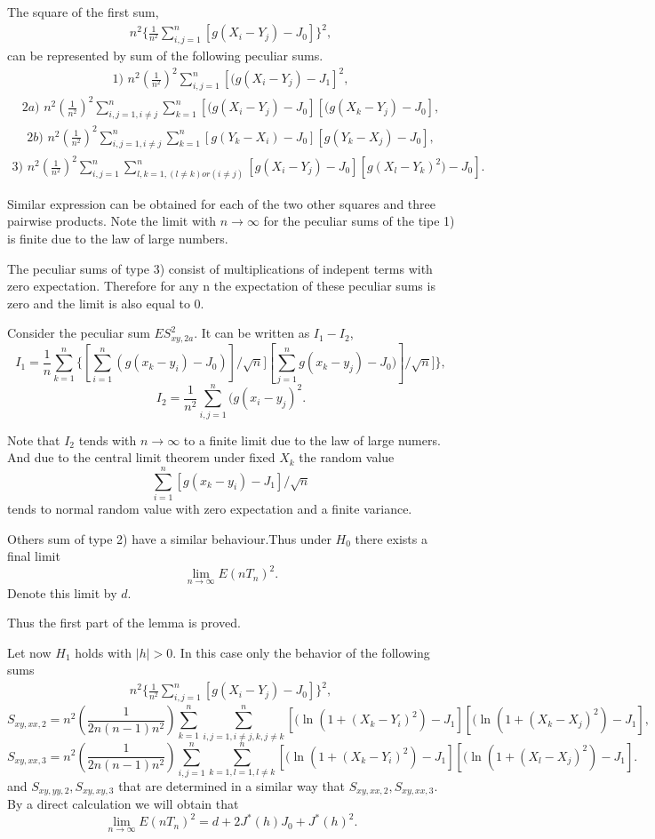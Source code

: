 \documentclass[final,11pt,3p]{elsarticle}
\begin{document}
The square of the first sum,
\begin{eqnarray*}
n^2 \{\frac{1}{n^2}\sum_{i,j=1}^n [g(X_i - Y_j)-J_0]\}^2,
\end{eqnarray*}
can be represented by sum of the following peculiar sums.
\begin{eqnarray*}
1)\,\,n^2 (\frac{1}{n^2})^2 \sum_{i,j=1}^n [(g(X_i - Y_j) -J_1]^2,
\end{eqnarray*}
\begin{eqnarray*}
2a)\,\,n^2(\frac{1}{n^2})^2 \sum_{i,j=1,i \ne j}^n\sum_{k=1}^n [(g(X_i - Y_j)-J_0][(g(X_k - Y_j)-J_0],
\end{eqnarray*}
\begin{eqnarray*}
2b)\,\,n^2(\frac{1}{n^2})^2 \sum_{i,j=1,i \ne j}^n\sum_{k=1}^n [g(Y_k - X_i)-J_0][g (Y_k - X_j)-J_0],
\end{eqnarray*}
\begin{eqnarray*}
3)\,\, n^2 (\frac{1}{n^2})^2 \sum_{i,j=1}^n\sum_{{l,k=1}, (l \ne  k)or(i\ne j)}^n  [g (X_i - Y_j)-J_0][g(X_l - Y_k)^2)-J_0].
\end{eqnarray*}

Similar expression can be obtained for each of the two other squares and three  pairwise
products.
Note the limit with $n \to \infty$ for the peculiar sums of the tipe 1) is finite due to the law of large numbers.

The peculiar sums of type 3) consist of multiplications of indepent terms with zero expectation. Therefore for any n the expectation of these peculiar sums is zero and the limit is also equal to 0.

Consider the peculiar sum $ES^2_{xy,2a}.$  It can be written as $I_1 - I_2$,
$$
I_1=\frac{1}{n}\sum_{k=1}^n \{[\sum_{i=1}^n
(g(x_k-y_i)-J_0)]/\sqrt{n}][\sum_{j=1}^n
g(x_k-y_j)-J_0)]/\sqrt{n}]\},
$$
$$
I_2= \frac {1}{n^2}\sum_{i,j=1}^n(g(x_i-y_j)^2.
$$

Note that $I_2$ tends with $n \to \infty$ to a finite limit due to the law of large numers. And
due to the central limit theorem
under fixed  $X_k$ the random value
$$
\sum_{i=1}^n
[g(x_k-y_i)-J_1]/\sqrt{n}
$$
tends to normal random value with zero expectation and a finite variance.

Others sum of type 2) have a similar behaviour.Thus under $H_0$  there exists a final limit
$$
\lim_{n \to \infty}E(nT_n)^2.
$$
Denote this limit by $d$.

Thus the first part of the lemma is proved.

Let now $H_1$ holds with
$|h|>0$. In this case only the behavior of the following sums
\begin{eqnarray*}
n^2 \{\frac{1}{n^2}\sum_{i,j=1}^n [g(X_i - Y_j)-J_0]\}^2,
\end{eqnarray*}
$$
S_{xy,xx,2}=n^2 (\frac{1}{2n(n-1)n^2})\sum_{k=1}^n \sum_{i,j=1, i\ne j,k, j\ne k}^n[(\ln(1 + (X_k - Y_i)^2)-J_1][(\ln(1 + (X_k - X_j)^2)-J_1],
$$
$$
S_{xy,xx,3}=n^2 (\frac{1}{2n(n-1)n^2})\sum_{i,j=1}^n\sum_{k=1,l=1,l \ne k}^n [(\ln(1 + (X_k - Y_i)^2)-J_1][(\ln(1 + (X_l - X_j)^2)-J_1].
$$
and $S_{xy,yy,2},S_{xy,xy,3}$ that are determined in a similar way that  $S_{xy,xx,2},S_{xy,xx,3}$.
By a direct calculation we will obtain that
$$
\lim_{n \to \infty}E(nT_n)^2=
d + 2J^*(h)J_0 + J^*(h)^2.
$$
\end{document}
